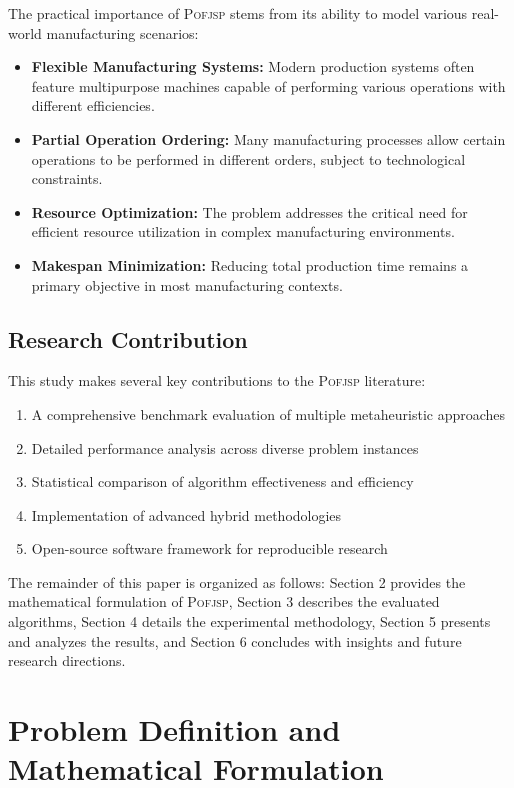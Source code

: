 \documentclass[11pt,a4paper]{article}
\newcommand{\pofjsp}{\textsc{Pofjsp}}
\begin{document}
The practical importance of \pofjsp{} stems from its ability to model various real-world manufacturing scenarios:

\begin{itemize}
    \item \textbf{Flexible Manufacturing Systems:} Modern production systems often feature multipurpose machines capable of performing various operations with different efficiencies.
    \item \textbf{Partial Operation Ordering:} Many manufacturing processes allow certain operations to be performed in different orders, subject to technological constraints.
    \item \textbf{Resource Optimization:} The problem addresses the critical need for efficient resource utilization in complex manufacturing environments.
    \item \textbf{Makespan Minimization:} Reducing total production time remains a primary objective in most manufacturing contexts.
\end{itemize}

\subsection{Research Contribution}

This study makes several key contributions to the \pofjsp{} literature:

\begin{enumerate}
    \item A comprehensive benchmark evaluation of multiple metaheuristic approaches
    \item Detailed performance analysis across diverse problem instances
    \item Statistical comparison of algorithm effectiveness and efficiency
    \item Implementation of advanced hybrid methodologies
    \item Open-source software framework for reproducible research
\end{enumerate}

The remainder of this paper is organized as follows: Section 2 provides the mathematical formulation of \pofjsp, Section 3 describes the evaluated algorithms, Section 4 details the experimental methodology, Section 5 presents and analyzes the results, and Section 6 concludes with insights and future research directions.


\section{Problem Definition and Mathematical Formulation}
\end{document}
